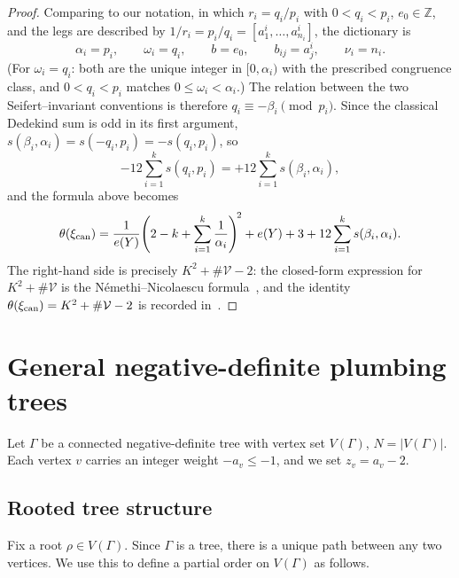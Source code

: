 \documentclass[11pt]{amsart}
\theoremstyle{plain}
\theoremstyle{definition}
\theoremstyle{remark}
\newcommand{\Z}{\mathbb{Z}}
\begin{document}
\begin{proof}
Comparing to our notation, in which $r_i=q_i/p_i$ with $0<q_i<p_i$,
$e_0\in\Z$, and the legs are described by
$1/r_i=p_i/q_i=[a^i_1,\dots,a^i_{n_i}]$, the dictionary is
\[
\alpha_i=p_i,\qquad
\omega_i=q_i,\qquad
b=e_0,\qquad
b_{ij}=a^i_j,\qquad
\nu_i=n_i.
\]
(For $\omega_i=q_i$: both are the unique integer in $[0,\alpha_i)$
with the prescribed congruence class, and $0<q_i<p_i$ matches
$0\le\omega_i<\alpha_i$.) The relation between the two
Seifert--invariant conventions is therefore
$q_i\equiv-\beta_i\pmod{p_i}$. Since the classical Dedekind sum is
odd in its first argument, $s(\beta_i,\alpha_i)=s(-q_i,p_i)=-s(q_i,p_i)$,
so
\[
-12\sum_{i=1}^k s(q_i,p_i)
=
+12\sum_{i=1}^k s(\beta_i,\alpha_i),
\]
and the formula above becomes
\[
\theta(\xi_{\rm can})
=
\frac{1}{e(Y)}\!\left(2-k+\sum_{i=1}^k\frac{1}{\alpha_i}\right)^{\!2}
+e(Y)+3+12\sum_{i=1}^k s(\beta_i,\alpha_i).
\]
The right-hand side is precisely $K^2+\#\mathcal{V}-2$: the
closed-form expression for $K^2+\#\mathcal{V}$ is the
N\'{e}methi--Nicolaescu formula~\cite[\S5]{NemethiNicolaescu2002}, and
the identity $\theta(\xi_{\rm can})=K^2+\#\mathcal{V}-2$ is recorded
in~\cite[Remark~4.8]{NemethiNicolaescu2002}.
\end{proof}


\section{General negative-definite plumbing trees}\label{sec:general}

Let $\Gamma$ be a connected negative-definite tree with vertex set
$V(\Gamma)$, $N=|V(\Gamma)|$. Each vertex $v$ carries an integer
weight $-a_v\le -1$, and we set $z_v=a_v-2$.

\subsection*{Rooted tree structure}

Fix a root $\rho\in V(\Gamma)$. Since $\Gamma$ is a tree, there is a
unique path between any two vertices. We use this to define a partial
order on $V(\Gamma)$ as follows.
\end{document}
